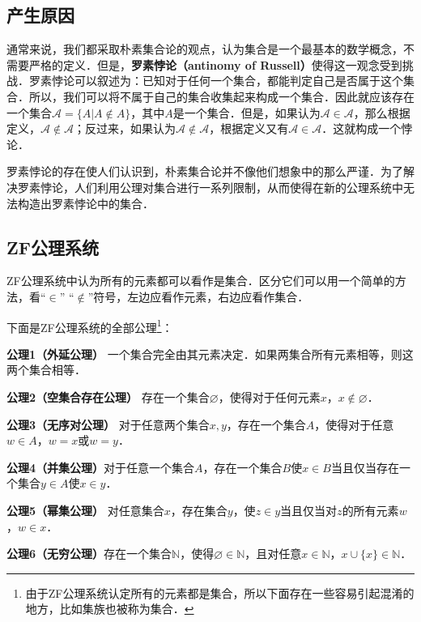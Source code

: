 \begin{issues}
\issueTODO
\end{issues}

\subsection{产生原因}
通常来说，我们都采取朴素集合论的观点，认为集合是一个最基本的数学概念，不需要严格的定义．但是，\textbf{罗素悖论（antinomy of Russell）}使得这一观念受到挑战．罗素悖论可以叙述为：已知对于任何一个集合，都能判定自己是否属于这个集合．所以，我们可以将不属于自己的集合收集起来构成一个集合．因此就应该存在一个集合$\mathcal{A}=\{A|A\notin A\}$，其中$A$是一个集合．但是，如果认为$\mathcal{A}\in\mathcal{A}$，那么根据定义，$\mathcal{A}\notin\mathcal{A}$；反过来，如果认为$\mathcal{A}\notin\mathcal{A}$，根据定义又有$\mathcal{A}\in\mathcal{A}$．这就构成一个悖论．

罗素悖论的存在使人们认识到，朴素集合论并不像他们想象中的那么严谨．为了解决罗素悖论，人们利用公理对集合进行一系列限制，从而使得在新的公理系统中无法构造出罗素悖论中的集合．

\subsection{ZF公理系统}
ZF公理系统中认为所有的元素都可以看作是集合．区分它们可以用一个简单的方法，看“$\in$” “$\notin$”符号，左边应看作元素，右边应看作集合．

下面是ZF公理系统的全部公理\footnote{由于ZF公理系统认定所有的元素都是集合，所以下面存在一些容易引起混淆的地方，比如集族也被称为集合．}：

\textbf{公理1（外延公理）} 一个集合完全由其元素决定．如果两集合所有元素相等，则这两个集合相等．

\textbf{公理2（空集合存在公理）} 存在一个集合$\varnothing$，使得对于任何元素$x$，$x\notin\varnothing$．

\textbf{公理3（无序对公理）} 对于任意两个集合$x,y$，存在一个集合$A$，使得对于任意$w\in A$，$w=x$或$w=y$．

\textbf{公理4（并集公理）}对于任意一个集合$A$，存在一个集合$B$使$x\in B$当且仅当存在一个集合$y\in A$使$x\in y$．

\textbf{公理5（幂集公理）} 对任意集合$x$，存在集合$y$，使$z\in y$当且仅当对$z$的所有元素$w$，$w\in x$．

\textbf{公理6（无穷公理）}存在一个集合$\mathbb{N}$，使得$\varnothing\in\mathbb{N}$，且对任意$x\in \mathbb{N}$，$x\cup\{x\}\in\mathbb{N}$．

